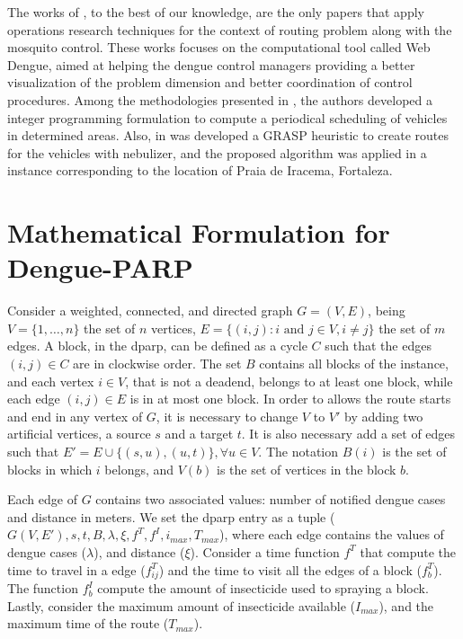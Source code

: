 \documentclass[a4paper,11pt]{article}
\begin{document}
The works of \cite{negreiros:2008,negreiros:2011,negreiros-2020}, to the best of
our knowledge, are the only papers that apply operations research techniques for
the context  of routing  problem along  with the  mosquito control.  These works
focuses on the computational tool called Web Dengue, aimed at helping the dengue
control managers providing  a better visualization of the  problem dimension and
better coordination of control procedures.  Among the methodologies presented in
\cite{negreiros:2008,negreiros:2011},   the   authors    developed   a   integer
programming  formulation  to compute  a  periodical  scheduling of  vehicles  in
determined areas. Also, in \cite{negreiros:2011} was developed a GRASP heuristic
to create routes for the vehicles with nebulizer, and the proposed algorithm was
applied  in a  instance  corresponding  to the  location  of  Praia de  Iracema,
Fortaleza.

\section{Mathematical Formulation for Dengue-PARP} \label{sec:formulation}

Consider a weighted, connected, and directed graph $G = (V, E)$, being $V = \{1,
\dots, n\}$ the  set of $n$ vertices, $E =  \{(i, j): i \text{ and }  j \in V, i
\neq j\}$ the set of $m$ edges. A block, in the \gls{dparp}, can be defined as a
cycle $C$ such that the edges $(i, j) \in C$ are in clockwise order. The set $B$
contains all blocks  of the instance, and each  vertex $i \in V$, that  is not a
deadend, belongs to at least one block, while  each edge $(i, j) \in E$ is in at
most one  block. In order to  allows the route starts  and end in any  vertex of
$G$, it is necessary to change $V$  to $V'$ by adding two artificial vertices, a
source $s$ and a  target $t$. It is also necessary add a  set of edges such that
$E' = E  \cup \{(s, u), (u, t)\},  \forall u \in V$. The notation  $B(i)$ is the
set of  blocks in which $i$  belongs, and $V(b)$ is  the set of vertices  in the
block $b$.

Each edge of $G$ contains two associated values: number of notified dengue cases
and distance in meters.  We set the \gls{dparp} entry as a  tuple ($G(V, E'), s,
t, B, \lambda,  \xi, f^T, f^I, i_{max}, T_{max}$), where  each edge contains the
values  of dengue  cases  ($\lambda$),  and distance  ($\xi$).  Consider a  time
function $f^T$ that  compute the time to  travel in a edge  ($f^T_{ij}$) and the
time to visit all  the edges of a block ($f^T_b$).  The function $f^I_b$ compute
the amount of insecticide used to spraying a block. Lastly, consider the maximum
amount of insecticide  available ($I_{max}$), and the maximum time  of the route
($T_{max}$).
\end{document}
